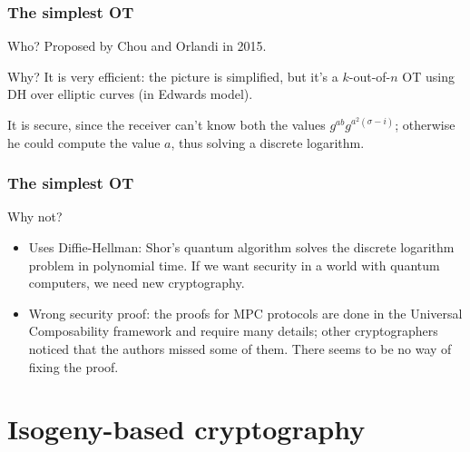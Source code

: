 \documentclass{beamer}
\begin{document}
    \begin{frame}
        \frametitle{The simplest OT}
        
        \begin{block}{Who?}
            Proposed by Chou and Orlandi in 2015.
        \end{block}
    
        \begin{block}{Why?}
            It is very efficient: the picture is simplified, but it's a $k$-out-of-$n$ OT using DH over elliptic curves (in Edwards model).
            
            It is secure, since the receiver can't know both the values $g^{ab}g^{a^2(\sigma-i)}$; otherwise he could compute the value $a$, thus solving a discrete logarithm.
        \end{block}
    \end{frame}


    \begin{frame}
        \frametitle{The simplest OT}
        
        \begin{block}{Why not?}
            \begin{itemize}[<+->]
                \item Uses Diffie-Hellman: Shor's quantum algorithm solves the discrete logarithm problem in polynomial time. If we want security in a world with quantum computers, we need new cryptography.
                \item Wrong security proof: the proofs for MPC protocols are done in the Universal Composability framework and require many details; other cryptographers noticed that the authors missed some of them. There seems to be no way of fixing the proof.
            \end{itemize}
        \end{block}
    \end{frame}


    \section{Isogeny-based cryptography}
    
\end{document}
